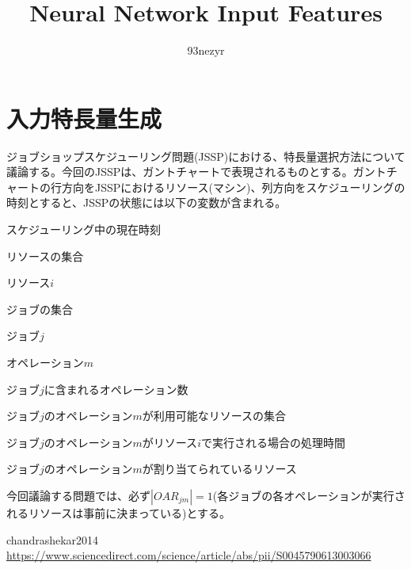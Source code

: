 \documentclass{ltjsarticle}
\begin{document}
\title{Neural Network Input Features}
\author{93nezyr}
\maketitle

\section{入力特長量生成}

ジョブショップスケジューリング問題(JSSP)における、特長量選択方法について議論する。今回のJSSPは、ガントチャートで表現されるものとする。ガントチャートの行方向をJSSPにおけるリソース(マシン)、列方向をスケジューリングの時刻とすると、JSSPの状態には以下の変数が含まれる。

\begin{description}[style=multiline, leftmargin=10em]
  \item[$t$] スケジューリング中の現在時刻
  \item[$R$] リソースの集合
  \item[$R_i \in R$] リソース$i$
  \item[$J$] ジョブの集合
  \item[$J_j \in J$] ジョブ$j$
  \item[$O_m$] オペレーション$m$
  \item[$ON_{j}$] ジョブ$j$に含まれるオペレーション数
  \item[$OAR_{jm} = \{r \in R\}$] ジョブ$j$のオペレーション$m$が利用可能なリソースの集合
  \item[$PT_{ijm}$] ジョブ$j$のオペレーション$m$がリソース$i$で実行される場合の処理時間
  \item[$OR_{jm} \in R$] ジョブ$j$のオペレーション$m$が割り当てられているリソース
\end{description}

今回議論する問題では、必ず$|OAR_{jm}| = 1$(各ジョブの各オペレーションが実行されるリソースは事前に決まっている)とする。

\begin{thebibliography}{99}
   chandrashekar2014 \\
  \url{https://www.sciencedirect.com/science/article/abs/pii/S0045790613003066}

\end{thebibliography}
\end{document}
